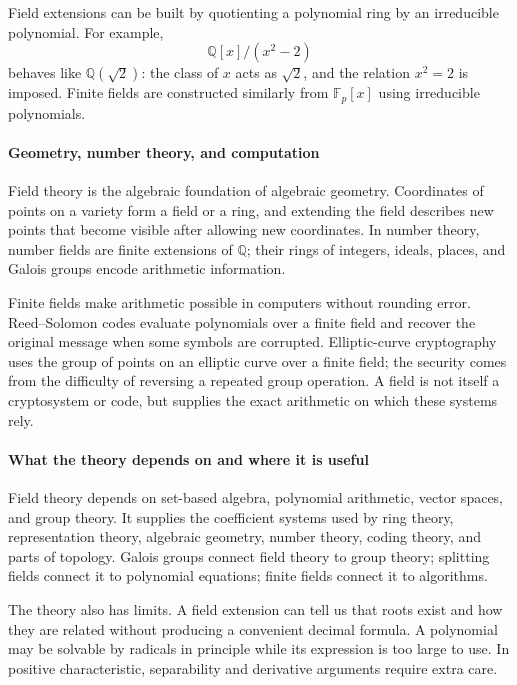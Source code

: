 Field extensions can be built by quotienting a polynomial ring by an irreducible polynomial. For example,
\[
\mathbb{Q}[x]/(x^2-2)
\]
behaves like $\mathbb{Q}(\sqrt2)$: the class of $x$ acts as $\sqrt2$, and the relation $x^2=2$ is imposed. Finite fields are constructed similarly from $\mathbb{F}_p[x]$ using irreducible polynomials.

\paragraph{Geometry, number theory, and computation}
Field theory is the algebraic foundation of algebraic geometry. Coordinates of points on a variety form a field or a ring, and extending the field describes new points that become visible after allowing new coordinates. In number theory, number fields are finite extensions of $\mathbb{Q}$; their rings of integers, ideals, places, and Galois groups encode arithmetic information.

Finite fields make arithmetic possible in computers without rounding error. Reed--Solomon codes evaluate polynomials over a finite field and recover the original message when some symbols are corrupted. Elliptic-curve cryptography uses the group of points on an elliptic curve over a finite field; the security comes from the difficulty of reversing a repeated group operation. A field is not itself a cryptosystem or code, but supplies the exact arithmetic on which these systems rely.

\paragraph{What the theory depends on and where it is useful}
Field theory depends on set-based algebra, polynomial arithmetic, vector spaces, and group theory. It supplies the coefficient systems used by ring theory, representation theory, algebraic geometry, number theory, coding theory, and parts of topology. Galois groups connect field theory to group theory; splitting fields connect it to polynomial equations; finite fields connect it to algorithms.

The theory also has limits. A field extension can tell us that roots exist and how they are related without producing a convenient decimal formula. A polynomial may be solvable by radicals in principle while its expression is too large to use. In positive characteristic, separability and derivative arguments require extra care.

